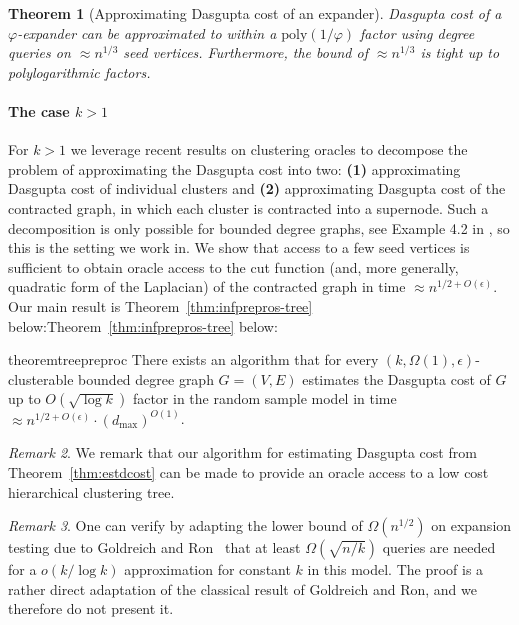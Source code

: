 \documentclass[letterpaper,11pt]{article}
\theoremstyle{plain}
\newtheorem{theorem}{Theorem}[section]
\theoremstyle{definition}
\theoremstyle{remark}
\newtheorem{remark}[theorem]{Remark}
\newcommand{\e}{\epsilon}
\begin{document}
\begin{theorem}[Approximating Dasgupta cost of an expander]\label{thm:iwehgiwehgh}
Dasgupta cost of a $\varphi$-expander can be approximated to within a $\text{poly}(1/\varphi)$ factor using degree queries on $\approx n^{1/3}$ seed vertices. Furthermore, the bound of $\approx n^{1/3}$ is tight up to polylogarithmic factors.
\end{theorem}



\paragraph{The case $k>1$}  For $ k >1$  we leverage recent results on clustering oracles to decompose the problem of approximating the Dasgupta cost into two: {\bf (1)} approximating Dasgupta cost of individual clusters and {\bf (2)} approximating Dasgupta cost of the contracted graph, in which each cluster is contracted into a supernode. 
Such a decomposition is only possible for bounded degree graphs, see Example 4.2 in {\cite{MSun21}}, so this is the setting we work in. We show that access to a few seed vertices is sufficient to obtain oracle access to the cut function (and, more generally, quadratic form of the Laplacian) of the contracted graph in time $\approx n^{1/2+O(\e)}$.   Our main result is Theorem~\ref{thm:infprepros-tree} below:Theorem~\ref{thm:infprepros-tree} below:

\begin{restatable}{theorem}{treepreproc}\label{thm:infprepros-tree}
There exists an algorithm that for every  $(k, \Omega(1), \e)$-clusterable bounded degree graph $G = (V, E)$ estimates the Dasgupta cost of $G$ up to $O(\sqrt{\log k})$ factor in the random sample model in time $\approx n^{1/2+O(\epsilon)}\cdot (d_{\max})^{O(1)}$. 
\end{restatable}

\begin{remark}
We remark that our algorithm for estimating Dasgupta cost from Theorem~\ref{thm:estdcost} can be made to provide an oracle access to a low cost hierarchical clustering tree.
\end{remark}

\begin{remark}
One can verify by adapting the lower bound of $\Omega(n^{1/2})$ on expansion testing due to Goldreich and Ron~\cite{GR02}  that at least $\Omega(\sqrt{n/k})$ queries are needed for a $o(k/\log k)$ approximation for constant $k$ in this model. The proof is a rather direct adaptation of the classical result of Goldreich and Ron, and we therefore do not present it.    
\end{remark}
\end{document}
